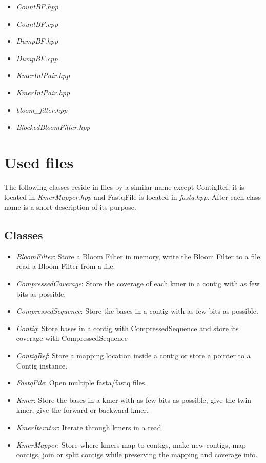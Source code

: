 \documentclass[a4paper]{report}
\renewcommand{\i}[1]{\textit{#1}}  %
\begin{document}
\begin{itemize}
\item \emph{CountBF.hpp}
\item \emph{CountBF.cpp}
\item \emph{DumpBF.hpp}
\item \emph{DumpBF.cpp}
\item \emph{KmerIntPair.hpp}
\item \emph{KmerIntPair.hpp}
\item \emph{bloom\_filter.hpp}
\item \emph{BlockedBloomFilter.hpp}
\end{itemize}

\section{Used files}
The following classes reside in files by a similar name except ContigRef, it is located in \emph{KmerMapper.hpp} and
FastqFile is located in \emph{fastq.hpp}. After each class name is a short description of its purpose.

\subsection{Classes}
\begin{itemize}
\item \i{BloomFilter}: Store a Bloom Filter in memory, write the Bloom Filter to a file, read a Bloom Filter from a file.
\item \i{CompressedCoverage}: Store the coverage of each kmer in a contig with as few bits as possible.
\item \i{CompressedSequence}: Store the bases in a contig with as few bits as possible.
\item \i{Contig}: Store bases in a contig with CompressedSequence and store its coverage with CompressedSequence
\item \i{ContigRef}: Store a mapping location inside a contig or store a pointer to a Contig instance.
\item \i{FastqFile}: Open multiple fasta/fastq files.
\item \i{Kmer}: Store the bases in a kmer with as few bits as possible, give the twin kmer, give the forward or backward kmer. 
\item \i{KmerIterator}: Iterate through kmers in a read.
\item \i{KmerMapper}: Store where kmers map to contigs, make new contigs, map contigs, join or split contigs while preserving the mapping and coverage info.

\end{itemize}
\end{document}
